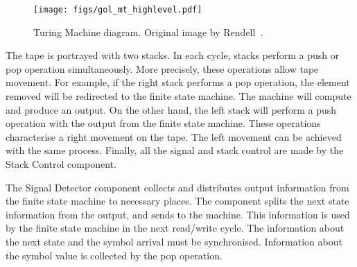 \documentclass[12pt]{article}
\begin{document}

\begin{figure}[h]
    \centering
    \texttt{[image: figs/gol\_mt\_highlevel.pdf]}
    \caption{Turing Machine diagram. Original image by Rendell~\cite{Rendell:inproc:2011:jul}.}
    \label{fig:gol_mt_highlevel}
\end{figure}

The tape is portrayed with two stacks. In each cycle, stacks perform a push or pop operation simultaneously. More precisely, these operations allow tape movement. For example, if the right stack performs a pop operation, the element removed will be redirected to the finite state machine. The machine will compute and produce an output. On the other hand, the left stack will perform a push operation with the output from the finite state machine. These operations characterise a right movement on the tape. The left movement can be achieved with the same process. Finally, all the signal and stack control are made by the Stack Control component.


The Signal Detector component collects and distributes output information from the finite state machine to necessary places. The component splits the next state information from the output, and sends to the machine. This information is used by the finite state machine in the next read/write cycle. The information about the next state and the symbol arrival must be synchronised. Information about the symbol value is collected by the pop operation.
\end{document}
